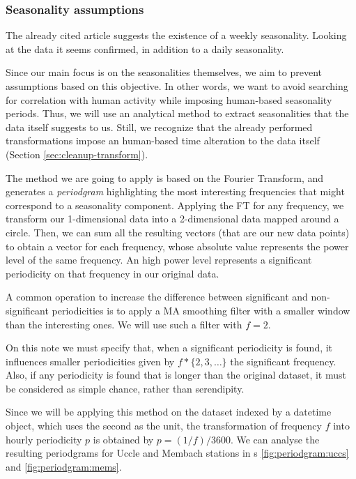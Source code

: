 \documentclass[12pt]{article}
\begin{document}
\subsubsection{Seasonality assumptions}
The already cited article \cite{NatureCoronavirusSeismic} suggests the existence of a weekly seasonality. Looking at the data it seems confirmed, in addition to a daily seasonality.

Since our main focus is on the seasonalities themselves, we aim to prevent assumptions based on this objective. In other words, we want to avoid searching for correlation with human activity while imposing human-based seasonality periods. Thus, we will use an analytical method to extract seasonalities that the data itself suggests to us. Still, we recognize that the already performed transformations impose an human-based time alteration to the data itself (Section \ref{sec:cleanup-transform}).

The method we are going to apply is based on the Fourier Transform, and generates a \textit{periodgram} highlighting the most interesting frequencies that might correspond to a seasonality component.
Applying the FT for any frequency, we transform our 1-dimensional data into a 2-dimensional data mapped around a circle. Then, we can sum all the resulting vectors (that are our new data points) to obtain a vector for each frequency, whose absolute value represents the power level of the same frequency. An high power level represents a significant periodicity on that frequency in our original data.

A common operation to increase the difference between significant and non-significant periodicities is to apply a MA smoothing filter with a smaller window than the interesting ones. We will use such a filter with $f=2$.

On this note we must specify that, when a significant periodicity is found, it influences smaller periodicities given by $f*\{2,3,\dots\}$ the significant frequency. Also, if any periodicity is found that is longer than the original dataset, it must be considered as simple chance, rather than serendipity.

Since we will be applying this method on the dataset indexed by a datetime object, which uses the second as the unit, the transformation of frequency $f$ into hourly periodicity $p$ is obtained by $p=(1/f)/3600$.
We can analyse the resulting periodgrams for Uccle and Membach stations in \figurename{s} \ref{fig:periodgram:uccs} and \ref{fig:periodgram:mems}.
\end{document}
